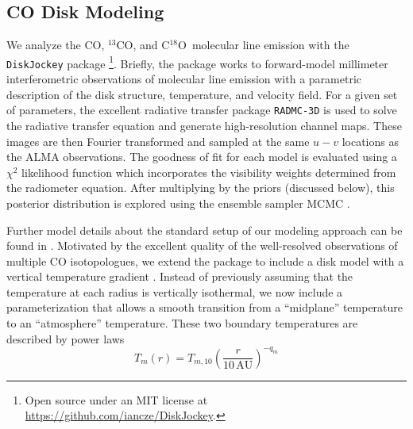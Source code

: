 \documentclass{aastex6}
\newcommand{\twelve}{CO}
\newcommand{\thirteen}{${}^{13}$CO}
\newcommand{\eighteen}{C${}^{18}$O}
\begin{document}
\subsection{CO Disk Modeling}



We analyze the \twelve, \thirteen, and \eighteen\ molecular line emission with the \texttt{DiskJockey} package \citep{czekala15a}\footnote{Open source under an MIT license at \url{https://github.com/iancze/DiskJockey}.}. Briefly, the package works to forward-model millimeter interferometric observations of molecular line emission with a parametric description of the disk structure, temperature, and velocity field. For a given set of parameters, the excellent radiative transfer package \texttt{RADMC-3D} \citep{dullemond12} is used to solve the radiative transfer equation and generate high-resolution channel maps. These images are then Fourier transformed and sampled at the same $u-v$ locations as the ALMA observations. The goodness of fit for each model is evaluated using a $\chi^2$ likelihood function which incorporates the visibility weights determined from the radiometer equation. After multiplying by the priors (discussed below), this posterior distribution is explored using the ensemble sampler MCMC \citep{goodman10,foreman-mackey13}.

Further model details about the standard setup of our modeling approach can be found in \citep{czekala15a,czekala16}. Motivated by the excellent quality of the well-resolved observations of multiple CO isotopologues, we extend the package to include a disk model with a vertical temperature gradient \citep[e.g.,][]{dartois03}. Instead of previously assuming that the temperature at each radius is vertically isothermal, we now include a parameterization \citep[following][]{rosenfeld13a,williams14} that allows a smooth transition from a ``midplane'' temperature to an ``atmosphere'' temperature. These two boundary temperatures are described by power laws
\begin{equation}
	T_m(r) = T_{m,10} \left ( \frac{r}{10\,\textrm{AU}} \right )^{-q_m}
\end{equation}
\end{document}
